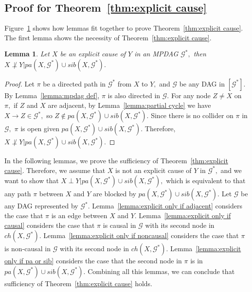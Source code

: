\documentclass{article}
\newtheorem{lemma}{Lemma}
\begin{document}
\subsection{Proof for Theorem~\ref{thm:explicit cause}}

\begin{figure}[omitted: a diagram of this paper's results, not reproduced here]\label{fig:proof for thm4}\end{figure}

Figure~\ref{fig:proof for thm4} shows how lemmas fit together to prove Theorem~\ref{thm:explicit cause}. The first lemma shows the necessity of Theorem~\ref{thm:explicit cause}.

\begin{lemma}
\label{lemma:explicit if}
Let $X$ be an explicit cause of $Y$ in an MPDAG $\mathcal{G}^*,$ then $X \not\perp Y|pa(X,\mathcal{G}^*)\cup sib(X,\mathcal{G}^*).$
\end{lemma}
\begin{proof}
Let $\pi$ be a directed path in $\mathcal{G}^*$ from $X$ to $Y,$ and $\mathcal{G}$ be any DAG in $[\mathcal{G}^*].$ By Lemma~\ref{lemma:mpdag def}, $\pi$ is also directed in $\mathcal{G}.$ For any node $Z\neq X$ on $\pi,$ if $Z$ and $X$ are adjacent, by Lemma~\ref{lemma:partial cycle} we have $X\to Z\in \mathcal{G}^*,$ so $Z\not\in pa(X,\mathcal{G}^*)\cup sib(X,\mathcal{G}^*).$ Since there is no collider on $\pi$ in $\mathcal{G},$ $\pi$ is open given $pa(X,\mathcal{G}^*)\cup sib(X,\mathcal{G}^*).$ Therefore, $X \not\perp Y|pa(X,\mathcal{G}^*)\cup sib(X,\mathcal{G}^*).$
\end{proof}

In the following lemmas, we prove the sufficiency of Theorem~\ref{thm:explicit cause}. Therefore, we assume that $X$ is not an explicit cause of $Y$ in $\mathcal{G}^*,$ and we want to show that $X \perp Y|pa(X,\mathcal{G}^*)\cup sib(X,\mathcal{G}^*),$ which is equivalent to that any path $\pi$ between $X$ and $Y$ are blocked by $pa(X,\mathcal{G}^*)\cup sib(X,\mathcal{G}^*).$ Let $\mathcal{G}$ be any DAG represented by $\mathcal{G}^*.$
Lemma~\ref{lemma:explicit only if adjacent} considers the case that $\pi$ is an edge between $X$ and $Y.$ Lemma~\ref{lemma:explicit only if causal} considers the case that $\pi$ is causal in $\mathcal{G}$ with its second node in $ch(X,\mathcal{G}^*).$ Lemma~\ref{lemma:explicit only if noncausal} considers the case that $\pi$ is non-causal in $\mathcal{G}$ with its second node in $ch(X,\mathcal{G}^*).$ Lemma~\ref{lemma:explicit only if pa or sib} considers the case that the second node in $\pi$ is in $pa(X,\mathcal{G}^*)\cup sib(X,\mathcal{G}^*).$ Combining all this lemmas, we can conclude that sufficiency of Theorem~\ref{thm:explicit cause} holds.
\end{document}
